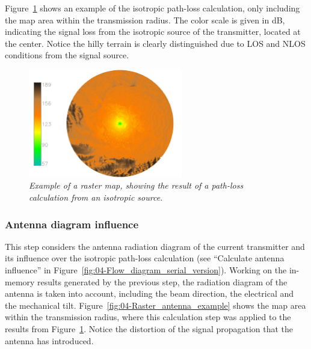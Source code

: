 Figure~\ref{fig:04-Raster_path_loss_example} shows an example of
the isotropic path-loss calculation, only including the map area within
the transmission radius. The color scale is given in dB, indicating
the signal loss from the isotropic source of the transmitter, located
at the center. Notice the hilly terrain is clearly distinguished due
to LOS and NLOS conditions from the signal source.

\begin{figure}
\centering

\includegraphics[width=0.6\textwidth]{04-framework_design_and_implementation/img/isotrophic_calculation}

\caption{\textit{\emph{Example of a raster map, showing the result of a path-loss
calculation from an isotropic source.\label{fig:04-Raster_path_loss_example}}}}
\end{figure}



\subsubsection{Antenna diagram influence \label{sub:04-Antenna_diagram_influence}}

This step considers the antenna radiation diagram of the current transmitter
and its influence over the isotropic path-loss calculation (see ``Calculate
antenna influence'' in Figure~\ref{fig:04-Flow_diagram_serial_version}).
Working on the in-memory results generated by the previous step, the
radiation diagram of the antenna is taken into account, including
the beam direction, the electrical and the mechanical tilt. Figure~\ref{fig:04-Raster_antenna_example}
shows the map area within the transmission radius, where this calculation
step was applied to the results from Figure~\ref{fig:04-Raster_path_loss_example}.
Notice the distortion of the signal propagation that the antenna has
introduced.

